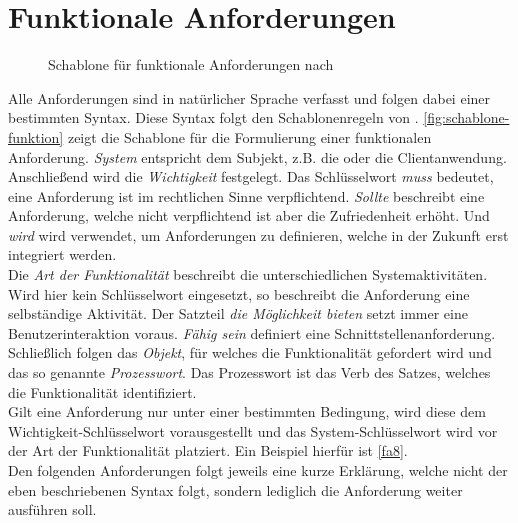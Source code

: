 \section{Funktionale Anforderungen}
\label{sec:funktionale}

\begin{figure}
    \centering
    
    \caption{Schablone für funktionale Anforderungen nach }
    \label{fig:schablone-funktion}
\end{figure}

Alle Anforderungen sind in natürlicher Sprache verfasst und folgen dabei einer bestimmten Syntax. Diese
Syntax folgt den Schablonenregeln von . \autoref{fig:schablone-funktion} zeigt die
Schablone für die Formulierung einer funktionalen Anforderung. \emph{System} entspricht dem 
Subjekt, z.B. die \shst{} oder die Clientanwendung. Anschließend wird die \emph{Wichtigkeit} festgelegt. 
Das Schlüsselwort \emph{muss} bedeutet, eine Anforderung ist im rechtlichen Sinne verpflichtend. \emph{Sollte} 
beschreibt eine Anforderung, welche nicht verpflichtend ist aber die Zufriedenheit erhöht. Und \emph{wird}
wird verwendet, um Anforderungen zu definieren, welche in der Zukunft erst integriert werden.\\
Die \emph{Art der Funktionalität} beschreibt die unterschiedlichen Systemaktivitäten. Wird hier kein Schlüsselwort
eingesetzt, so beschreibt die Anforderung eine selbständige Aktivität. Der Satzteil \emph{die Möglichkeit bieten}
setzt immer eine Benutzerinteraktion voraus. \emph{Fähig sein} definiert eine Schnittstellenanforderung.\\
Schließlich folgen das \emph{Objekt}, für welches die Funktionalität gefordert wird und das so genannte \emph{Prozesswort}. Das
Prozesswort ist das Verb des Satzes, welches die Funktionalität identifiziert.\\
Gilt eine Anforderung nur unter einer bestimmten Bedingung, wird diese dem Wichtigkeit-Schlüsselwort vorausgestellt und
das System-Schlüsselwort wird vor der Art der Funktionalität platziert. Ein Beispiel hierfür ist \ref{fa8}.\\

Den folgenden Anforderungen folgt jeweils eine kurze Erklärung, welche nicht der eben beschriebenen Syntax folgt,
sondern lediglich die Anforderung weiter ausführen soll. 

